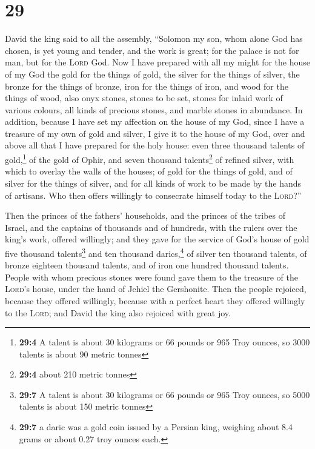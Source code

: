 \hypertarget{section-28}{%
\section{29}\label{section-28}}

 David the king said to all the assembly, ``Solomon my
son, whom alone God has chosen, is yet young and tender, and the work is
great; for the palace is not for man, but for the \textsc{Lord} God.
 Now I have prepared with all my might for the house of my
God the gold for the things of gold, the silver for the things of
silver, the bronze for the things of bronze, iron for the things of
iron, and wood for the things of wood, also onyx stones, stones to be
set, stones for inlaid work of various colours, all kinds of precious
stones, and marble stones in abundance.  In addition,
because I have set my affection on the house of my God, since I have a
treasure of my own of gold and silver, I give it to the house of my God,
over and above all that I have prepared for the holy house:
 even three thousand talents of gold,\footnote{\textbf{29:4}
  A talent is about 30 kilograms or 66 pounds or 965 Troy ounces, so
  3000 talents is about 90 metric tonnes} of the gold of Ophir, and
seven thousand talents\footnote{\textbf{29:4} about 210 metric tonnes}
of refined silver, with which to overlay the walls of the houses;
 of gold for the things of gold, and of silver for the
things of silver, and for all kinds of work to be made by the hands of
artisans. Who then offers willingly to consecrate himself today to the
\textsc{Lord}?''

 Then the princes of the fathers' households, and the
princes of the tribes of Israel, and the captains of thousands and of
hundreds, with the rulers over the king's work, offered willingly;
 and they gave for the service of God's house of gold five
thousand talents\footnote{\textbf{29:7} A talent is about 30 kilograms
  or 66 pounds or 965 Troy ounces, so 5000 talents is about 150 metric
  tonnes} and ten thousand darics,\footnote{\textbf{29:7} a daric was a
  gold coin issued by a Persian king, weighing about 8.4 grams or about
  0.27 troy ounces each.} of silver ten thousand talents, of bronze
eighteen thousand talents, and of iron one hundred thousand talents.
 People with whom precious stones were found gave them to
the treasure of the \textsc{Lord}'s house, under the hand of Jehiel the
Gershonite.  Then the people rejoiced, because they
offered willingly, because with a perfect heart they offered willingly
to the \textsc{Lord}; and David the king also rejoiced with great joy.

